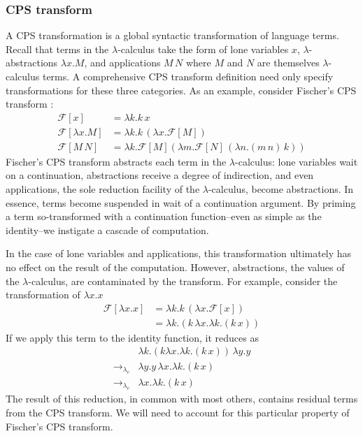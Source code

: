 \documentclass[ms,electronic,twosidetoc,letterpaper,chaptercenter,parttop]{byumsphd}
\newcommand{\lvrr}{\rightarrow_{\lambda_v}}
\begin{document}
\subsubsection{CPS transform}

A CPS transformation is a global syntactic transformation of language terms. Recall that
terms in the $\lambda$-calculus take the form of lone variables $x$,
$\lambda$-abstractions $\lambda x.M$, and applications $M\,N$ where $M$ and $N$ are
themselves $\lambda$-calculus terms. A comprehensive CPS transform definition need only
specify transformations for these three categories. As an example, consider Fischer's CPS
transform \cite{fischer1972lambda}:
\begin{align*}
\mathcal{F}[x]           &= \lambda k.k\,x\\
\mathcal{F}[\lambda x.M] &= \lambda k.k\,(\lambda x.\mathcal{F}[M])\\
\mathcal{F}[M\,N]        &= \lambda k.\mathcal{F}[M](\lambda m.\mathcal{F}[N]\,(\lambda n.(m\,n)\,k))
\end{align*}
Fischer's CPS transform abstracts each term in the $\lambda$-calculus: lone variables
wait on a continuation, abstractions receive a degree of indirection, and even
applications, the sole reduction facility of the $\lambda$-calculus, become abstractions.
In essence, terms become suspended in wait of a continuation argument. By priming a term
so-transformed with a continuation function--even as simple as the identity--we instigate
a cascade of computation.

In the case of lone variables and applications, this transformation ultimately has no
effect on the result of the computation. However, abstractions, the values of the
$\lambda$-calculus, are contaminated by the transform. For example, consider the
transformation of $\lambda x.x$
\begin{align*}
\mathcal{F}[\lambda x.x] &= \lambda k.k\,(\lambda x.\mathcal{F}[x])\\
                         &= \lambda k.(k\,\lambda x.\lambda k.(k\,x))
\end{align*}
If we apply this term to the identity function, it reduces as
\begin{align*}
                        &\lambda k.(k \lambda x.\lambda k.(k\,x))\,\lambda y.y\\
\lvrr &\lambda y.y\,\lambda x.\lambda k.(k\,x)\\
\lvrr &\lambda x.\lambda k.(k\,x)
\end{align*}
The result of this reduction, in common with most others, contains residual terms from the
CPS transform. We will need to account for this particular property of Fischer's CPS
transform.
\end{document}
